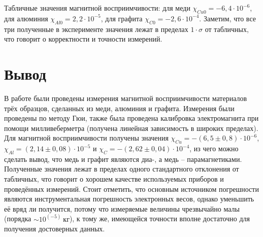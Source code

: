 \documentclass[a4paper,12pt]{article}
\begin{document}
Табличные значения магнитной восприимчивости: для меди $\chi_{Cu0}=-6,4\cdot10^{-6}$, для алюминия $\chi_{Al0}=2,2\cdot10^{-5}$, для графита $\chi_{C0}=-2,6\cdot10^{-4}$. Заметим, что все три полученные в эксперименте значения лежат в пределах $1\cdot\sigma$ от табличных, что говорит о корректности и точности измерений.

\section*{Вывод}

В работе были проведены измерения магнитной восприимчивости материалов трёх образцов, сделанных из меди, алюминия и графита. Измерения были проведены по методу Гюи, также была проведена калибровка электромагнита при помощи милливеберметра (получена линейная зависимость в широких пределах). Для магнитной восприимчивости получены значения $\chi_{Cu}=-\left(6,5\pm0,8\right)\cdot10^{-6}$, $\chi_{Al}=\left(2,14\pm0,08\right)\cdot10^{-5}$ и $\chi_C=-\left(2,62\pm0,04\right)\cdot10^{-4}$, из чего можно сделать вывод, что медь и графит являются диа-, а медь -- парамагнетиками. Полученные значения лежат в пределах одного стандартного отклонения от табличных, что говорит о хорошем качестве используемых приборов и проведённых измерений. Стоит отметить, что основным источником погрешности являются инструментальная погрешность электронных весов, однако уменьшить её вряд ли получится, потому что измеряемые величины чрезвычайно малы (порядка $\sim10^{(-5)}~\text{кг}$), к тому же, имеющейся точности вполне достаточно для получения достоверных данных.
\end{document}
